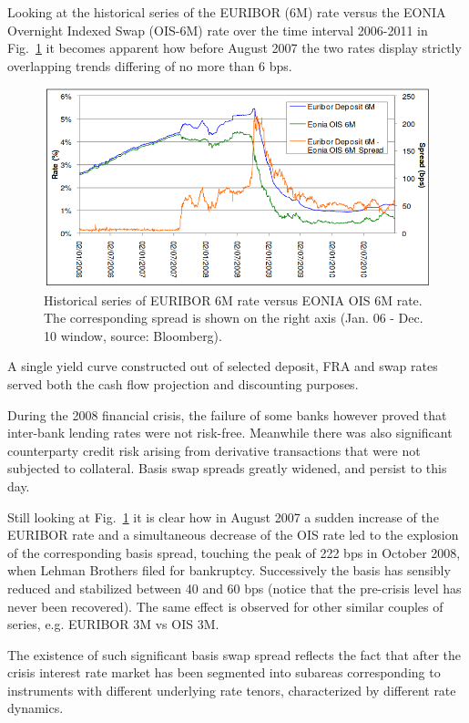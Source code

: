 Looking at the historical series of the EURIBOR (6M) rate versus the EONIA Overnight Indexed Swap (OIS-6M) rate over the time interval 2006-2011 in Fig.~\ref{fig:credit_crunch} it becomes apparent how before August 2007 the two rates display strictly overlapping trends differing of no more than 6 bps.

\begin{figure}[htb]
	\centering
	\includegraphics[width=0.9\linewidth]{figures/credit_crunch.png}
	\caption{Historical series of EURIBOR 6M rate versus EONIA OIS 6M rate. The corresponding spread 
		is shown on the right axis (Jan. 06 - Dec. 10 window, source: Bloomberg).}
	\label{fig:credit_crunch}
\end{figure}

A single yield curve constructed out of selected deposit, FRA and swap rates served both the cash flow projection and discounting purposes.

During the 2008 financial crisis, the failure of some banks however proved that inter-bank lending rates were not risk-free. Meanwhile there was also significant counterparty credit risk arising from derivative transactions that were not subjected to collateral. Basis swap spreads greatly widened, and persist to this day. 

Still looking at Fig.~\ref{fig:credit_crunch} it is clear how in August 2007 a sudden increase of the EURIBOR rate and a simultaneous decrease of the OIS rate led to the explosion of the corresponding basis spread, touching the peak of 222 bps in October 2008, when Lehman Brothers filed for bankruptcy. Successively the basis has sensibly reduced and stabilized between 40 and 60 bps (notice that the pre-crisis level has never been recovered). The same effect is observed for other similar couples of series, e.g. EURIBOR 3M vs OIS 3M.

The existence of such significant basis swap spread reflects the fact that after the crisis interest rate market has been segmented into subareas corresponding to instruments with different underlying rate tenors, characterized by different rate dynamics. 

